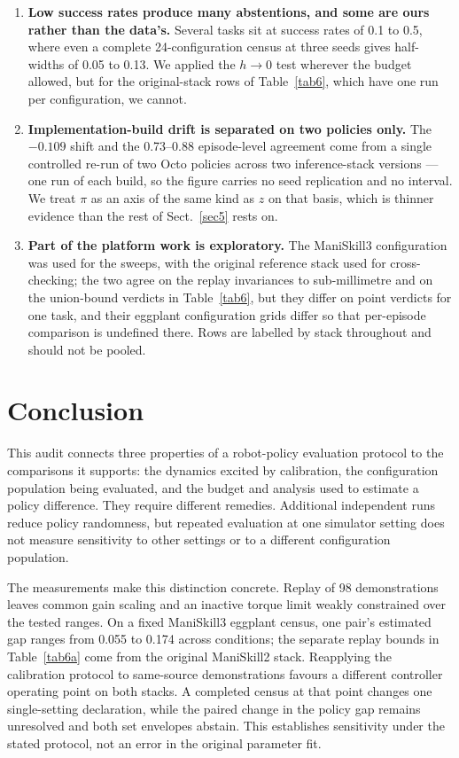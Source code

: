 \documentclass[pdflatex,iicol,sn-apa]{sn-jnl}
\theoremstyle{remark}
\begin{document}
\begin{enumerate}
\item \textbf{Low success rates produce many abstentions, and some are ours rather than the data's.}
Several tasks sit at success rates of 0.1 to 0.5, where even a complete 24-configuration census at
three seeds gives half-widths of 0.05 to 0.13. We applied the $h \to 0$ test wherever the budget
allowed, but for the original-stack rows of Table~\ref{tab6}, which have one run per configuration,
we cannot.

\item \textbf{Implementation-build drift is separated on two policies only.} The $-0.109$ shift and
the 0.73--0.88 episode-level agreement come from a single controlled re-run of two Octo policies
across two inference-stack versions --- one run of each build, so the figure carries no seed
replication and no interval. We treat $\pi$ as an axis of the same kind as $z$ on that basis, which is
thinner evidence than the rest of Sect.~\ref{sec5} rests on.

\item \textbf{Part of the platform work is exploratory.} The ManiSkill3 configuration was used for
the sweeps, with the original reference stack used for cross-checking; the two agree on the replay
invariances to sub-millimetre and on the union-bound verdicts in Table~\ref{tab6}, but they differ on
point verdicts for one task, and their eggplant configuration grids differ so that per-episode
comparison is undefined there. Rows are labelled by stack throughout and should not be pooled.
\end{enumerate}

\section{Conclusion}\label{sec10}

This audit connects three properties of a robot-policy evaluation protocol to the comparisons it
supports: the dynamics excited by calibration, the configuration population being evaluated, and
the budget and analysis used to estimate a policy difference. They require different remedies.
Additional independent runs reduce policy randomness, but repeated evaluation at one simulator
setting does not measure sensitivity to other settings or to a different configuration population.

The measurements make this distinction concrete. Replay of 98 demonstrations leaves common gain
scaling and an inactive torque limit weakly constrained over the tested ranges. On a fixed
ManiSkill3 eggplant census, one pair's estimated gap ranges from 0.055 to 0.174 across conditions;
the separate replay bounds in Table~\ref{tab6a} come from the original ManiSkill2 stack. Reapplying
the calibration protocol to same-source demonstrations favours a different controller operating
point on both stacks. A completed census at that point changes one single-setting declaration,
while the paired change in the policy gap remains unresolved and both set envelopes abstain.
This establishes sensitivity under the stated protocol, not an error in the original parameter fit.
\end{document}
